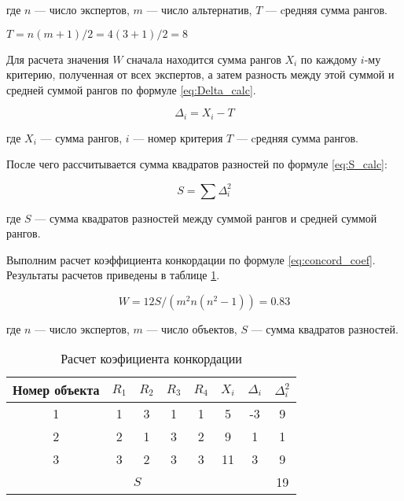 \noindent
где $n$ --- число экспертов,
$m$ --- число альтернатив, 
$T$ --- cредняя сумма рангов.

\begin{center}
    $T=n(m+1)/2 = 4(3+1)/2=8$
\end{center}

Для расчета значения $W$ сначала находится сумма рангов $X_i$ по каждому $i$-му критерию, полученная от всех экспертов, 
а затем разность между этой суммой и средней суммой рангов по формуле \ref{eq:Delta_calc}.

\begin{equation}
    \label{eq:Delta_calc}
    \Delta_i=X_i-T
\end{equation}
\vspace{1em}

\noindent
где $X_i$ --- сумма рангов,
$i$ --- номер критерия 
$T$ --- cредняя сумма рангов.

После чего рассчитывается сумма квадратов разностей по формуле \ref{eq:S_calc}:

\begin{equation}
    \label{eq:S_calc}
    S=\sum{\Delta^2_i}
\end{equation}
\vspace{1em}

\noindent
где $S$ --- сумма квадратов разностей между суммой рангов и средней суммой рангов.

Выполним расчет коэффициента конкордации по формуле \ref{eq:concord_coef}.
Результаты расчетов приведены в таблице \ref{table:experts_concord}.

\begin{equation}
    \label{eq:concord_coef}
    W = 12S/(m^2 n (n^2-1)) = 0.83
\end{equation}

\noindent
где $n$ --- число экспертов,
$m$ --- число объектов,
$S$ --- сумма квадратов разностей.

\begin{table}[H]
    \centering
    \caption{Расчет коэфициента конкордации}\label{table:experts_concord}
    \begin{tabular}{|c|c|c|c|c|c|c|c|}
    \hline Номер объекта & $R_1$ & $R_2$ & $R_3$ & $R_4$ & $X_i$ & $\Delta_i$ & $\Delta^2_i$ \\
    \hline 1 & 1 & 3 & 1 & 1  & 5 & -3 & 9 \\
    \hline 2 & 2 & 1 & 3 &  2 & 9 & 1 & 1 \\
    \hline 3 & 3 & 2 & 3 & 3 & 11 & 3 & 9 \\
    \hline \multicolumn{7}{|c|}{$S$} & 19 \\
    \hline
    \end{tabular}
\end{table}

